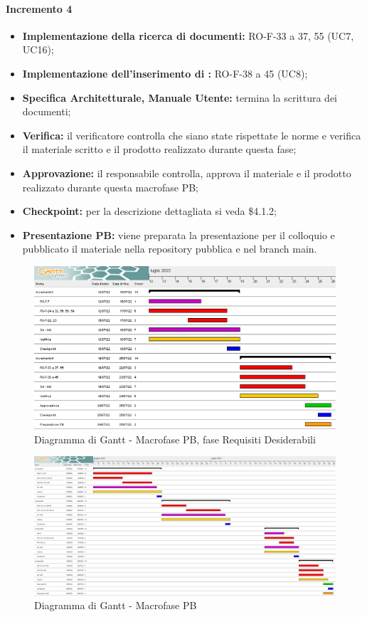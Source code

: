 \paragraph{Incremento 4}
\begin{itemize}
    \item \textbf{Implementazione della ricerca di documenti:} RO-F-33 a 37, 55 (UC7, UC16);
    \item \textbf{Implementazione dell'inserimento di :} RO-F-38 a 45 (UC8);
    \item \textbf{Specifica Architetturale, Manuale Utente:} termina la scrittura dei documenti;
    \item \textbf{Verifica:} il verificatore controlla che siano state rispettate le norme e verifica il materiale scritto e il prodotto realizzato durante questa fase;
    \item \textbf{Approvazione:} il responsabile controlla, approva il materiale e il prodotto realizzato durante questa macrofase PB;
    \item \textbf{Checkpoint:} per la descrizione dettagliata si veda \$4.1.2;
    \item \textbf{Presentazione PB:} viene preparata la presentazione per il colloquio e pubblicato il materiale nella repository pubblica e nel branch main.
\end{itemize}

\begin{landscape}
	\begin{figure}
	\includegraphics[width=\linewidth]{images/PB_desiderabili.png}
    \caption{Diagramma di Gantt - Macrofase PB, fase Requisiti Desiderabili}
	\end{figure}
\end{landscape}

\begin{landscape}
	\begin{figure}
	\includegraphics[width=\linewidth]{images/PB.png}
    \caption{Diagramma di Gantt - Macrofase PB}
	\end{figure}
\end{landscape}
